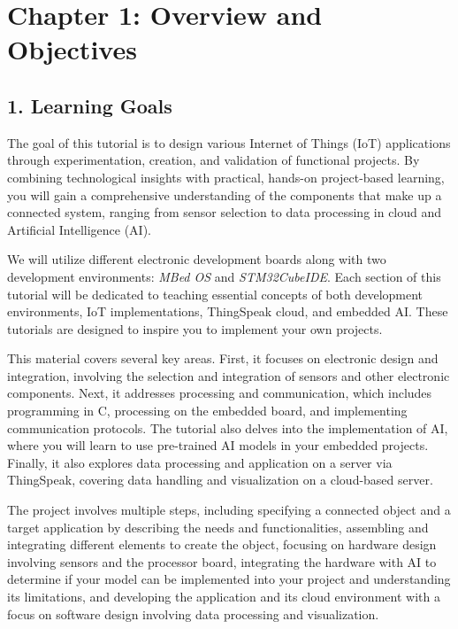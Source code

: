 \documentclass[10pt,a4paper,onecolumn]{article}
\begin{document}
\hypertarget{chapter-1-overview-and-objectives}{%
\section{Chapter 1: Overview and
Objectives}\label{chapter-1-overview-and-objectives}}

\hypertarget{learning-goals}{%
\subsection{1. Learning Goals}\label{learning-goals}}

The goal of this tutorial is to design various Internet of Things (IoT) applications through experimentation, creation, and validation of functional projects. By combining technological insights with practical, hands-on project-based learning, you will gain a comprehensive understanding of the components that make up a connected system, ranging from sensor selection to data processing in cloud and Artificial Intelligence (AI).

We will utilize different electronic development boards along with two development environments: \textit{MBed OS} and \textit{STM32CubeIDE}. Each section of this tutorial will be dedicated to teaching essential concepts of both development environments, IoT implementations, ThingSpeak cloud, and embedded AI. These tutorials are designed to inspire you to implement your own projects.

This material covers several key areas. First, it focuses on electronic design and integration, involving the selection and integration of sensors and other electronic components. Next, it addresses processing and communication, which includes programming in C, processing on the embedded board, and implementing communication protocols. The tutorial also delves into the implementation of AI, where you will learn to use pre-trained AI models in your embedded projects. Finally, it also explores data processing and application on a server via ThingSpeak, covering data handling and visualization on a cloud-based server.

The project involves multiple steps, including specifying a connected object and a target application by describing the needs and functionalities, assembling and integrating different elements to create the object, focusing on hardware design involving sensors and the processor board, integrating the hardware with AI to determine if your model can be implemented into your project and understanding its limitations, and developing the application and its cloud environment with a focus on software design involving data processing and visualization.
\end{document}
